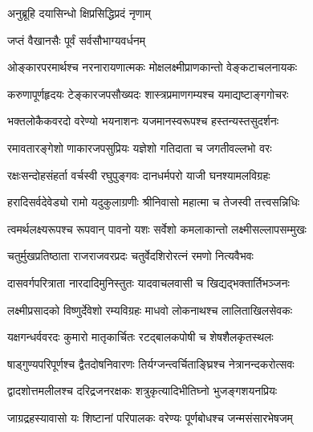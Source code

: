 

{अनुब्रूहि  दयासिन्धो  क्षिप्रसिद्धिप्रदं  नृणाम्}

{जप्तं  वैखानसैः  पूर्वं  सर्वसौभाग्यवर्धनम्}

\twolineshloka
{ओङ्कारपरमार्थश्च  नरनारायणात्मकः}
{मोक्षलक्ष्मीप्राणकान्तो वेङ्कटाचलनायकः}

\twolineshloka
{करुणापूर्णहृदयः टेङ्कारजपसौख्यदः}
{शास्त्रप्रमाणगम्यश्च यमाद्यष्टाङ्गगोचरः}
    
\twolineshloka
{भक्तलोकैकवरदो वरेण्यो भयनाशनः}
{यजमानस्वरूपश्च हस्तन्यस्तसुदर्शनः}
        
\twolineshloka
{रमावतारङ्गेशो णाकारजपसुप्रियः}
{यज्ञेशो गतिदाता च जगतीवल्लभो वरः}
            
\twolineshloka
{रक्षःसन्दोहसंहर्ता वर्चस्वी रघुपुङ्गवः}
{दानधर्मपरो याजी घनश्यामलविग्रहः}
                
\twolineshloka
{हरादिसर्वदेवेड्यो रामो यदुकुलाग्रणीः}
{श्रीनिवासो महात्मा च तेजस्वी तत्त्वसन्निधिः}
                    
\twolineshloka
{त्वमर्थलक्ष्यरूपश्च रूपवान् पावनो यशः}
{सर्वेशो कमलाकान्तो लक्ष्मीसल्लापसम्मुखः}
                        
\twolineshloka
{चतुर्मुखप्रतिष्ठाता राजराजवरप्रदः}
{चतुर्वेदशिरोरत्नं रमणो नित्यवैभवः}
                            
\twolineshloka
{दासवर्गपरित्राता नारदादिमुनिस्तुतः}
{यादवाचलवासी च खिद्यद्भक्तार्तिभञ्जनः}
                                
\twolineshloka
{लक्ष्मीप्रसादको विष्णुर्देवेशो रम्यविग्रहः}
{माधवो लोकनाथश्च लालिताखिलसेवकः}
                                    
\twolineshloka
{यक्षगन्धर्ववरदः कुमारो मातृकार्चितः}
{रटद्बालकपोषी च शेषशैलकृतस्थलः}
                                        
\twolineshloka
{षाड्गुण्यपरिपूर्णश्च द्वैतदोषनिवारणः}
{तिर्यग्जन्त्वर्चिताङ्घ्रिश्च नेत्रानन्दकरोत्सवः}
                                            
\twolineshloka
{द्वादशोत्तमलीलश्च दरिद्रजनरक्षकः}
{शत्रुकृत्यादिभीतिघ्नो भुजङ्गशयनप्रियः}
                                                
\twolineshloka
{जाग्रद्रहस्यावासो यः शिष्टानां  परिपालकः}
{वरेण्यः पूर्णबोधश्च जन्मसंसारभेषजम्}
                                                    
